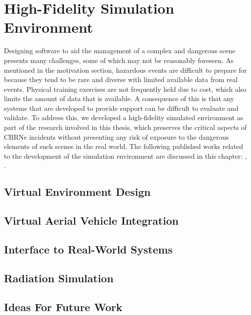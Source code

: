 \chapter{High-Fidelity Simulation Environment}
\workinprogress
Designing software to aid the management of a complex and dangerous scene presents many challenges, some of which may not be reasonably foreseen. As mentioned in the motivation section, hazardous events are difficult to prepare for because they tend to be rare and diverse with limited available data from real events. Physical training exercises are not frequently held due to cost, which also limits the amount of data that is available. A consequence of this is that any systems that are developed to provide support can be difficult to evaluate and validate. To address this, we developed a high-fidelity simulated environment as part of the research involved in this thesis, which preserves the critical aspects of CBRNe incidents without presenting any risk of exposure to the dangerous elements of such scenes in the real world. The following published works related to the development of the simulation environment are discussed in this chapter: \citet{Smyth2018AInvestigation}, \citet{Smyth2018UsingDrones}.\par


\section{Virtual Environment Design}


\section{Virtual Aerial Vehicle Integration}


\section{Interface to Real-World Systems}

\section{Radiation Simulation}

\section{Ideas For Future Work}